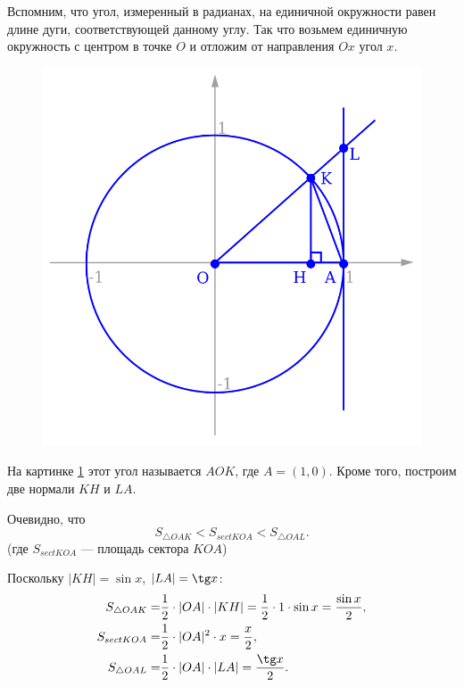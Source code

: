 \begin{enumerate}
Вспомним, что угол, измеренный в радианах, на единичной окружности равен длине дуги, соответствующей данному углу. Так что возьмем единичную окружность с центром в точке $O$ и отложим от направления $Ox$ угол $x$.
\begin{figure}[hbt!]
\begin{center}
\includegraphics[scale=0.3]{sinx.png}
\end{center}\caption{}\label{sinx}
\end{figure}

На картинке \ref{sinx} этот угол называется $AOK$, где $A=(1,0)$. Кроме того, построим две нормали $KH$ и $LA$.

Очевидно, что
\begin{equation}\label{SSS}
S_{\triangle OAK} < S_{sect KOA} < S_{\triangle OAL}.
\end{equation}
(где $S_{sect KOA}$ --- площадь сектора $KOA$)

Поскольку $|KH| = \sin x$, $|LA| = \tg x$:
\begin{align*}
S_{\triangle OAK} = & \frac{1}{2} \cdot |OA| \cdot|KH| = \frac{1}{2} \cdot 1 \cdot \sin x = \frac{\sin x}{2}, \\
S_{sect KOA} = & \frac{1}{2} \cdot |OA|^2 \cdot x = \frac{x}{2}, \\
S_{\triangle OAL} = & \frac{1}{2} \cdot |OA| \cdot |LA| = \frac{\tg x}{2}.
\end{align*}


\end{enumerate}
